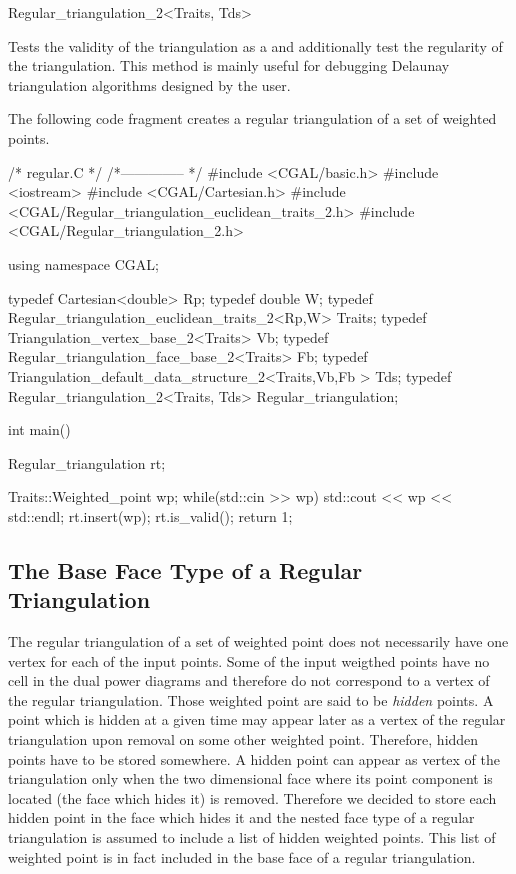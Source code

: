 \begin{ccClassTemplate}{Regular_triangulation_2<Traits, Tds>}
\begin{ccAdvanced}

{ Tests the validity of the triangulation as a 
and additionally test the regularity of the triangulation. This method is
 mainly  useful for debugging Delaunay triangulation algorithms designed by
 the user.}
\end{ccAdvanced}
\end{ccClassTemplate}

\ccExample

The following code fragment creates a regular triangulation 
of a set of weighted points.


\begin{cprog}
/*     regular.C */
/*-------------- */
#include <CGAL/basic.h>
#include <iostream>
#include <CGAL/Cartesian.h>
#include <CGAL/Regular_triangulation_euclidean_traits_2.h>
#include <CGAL/Regular_triangulation_2.h>

using namespace CGAL;

typedef Cartesian<double> Rp;
typedef double W;
typedef Regular_triangulation_euclidean_traits_2<Rp,W>  Traits;
typedef Triangulation_vertex_base_2<Traits> Vb;
typedef Regular_triangulation_face_base_2<Traits> Fb;
typedef Triangulation_default_data_structure_2<Traits,Vb,Fb > Tds;
typedef Regular_triangulation_2<Traits, Tds> Regular_triangulation;

int main()
{
   Regular_triangulation rt;

   Traits::Weighted_point wp;
   while(std::cin >> wp){
     std::cout << wp << std::endl;
     rt.insert(wp);
   }
   rt.is_valid();
   return 1;	
}

\end{cprog} 

\subsection{The Base Face Type of a Regular Triangulation}
The regular triangulation of a set of weighted point does not
necessarily
have one vertex for each of the input points. Some of the input
weigthed points have no cell in the dual power diagrams
and therefore do not correspond to a vertex of the regular
triangulation.
Those weighted point are said to be {\it hidden} points.
A  point which is hidden at a given time may appear later as a vertex of
the regular triangulation upon removal on some other weighted point.
Therefore, hidden points have to be stored somewhere.
A hidden point can appear as vertex of the triangulation
only when the
two dimensional face where its point component is located
(the face which hides it)
is removed. Therefore we decided to store each hidden point
in the face which  hides it and the nested face type of a 
regular triangulation is assumed to include a list of hidden 
weighted points. This list of weighted point is in fact included
in the base face of a regular triangulation.



